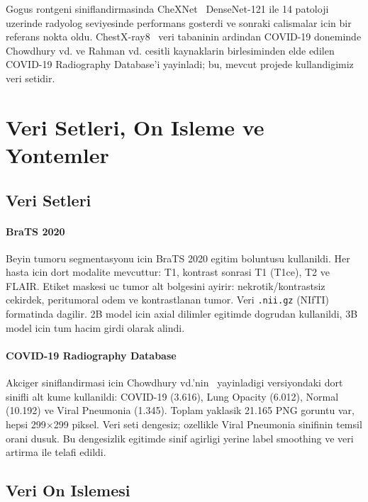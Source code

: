 \documentclass[conference]{IEEEtran}
\begin{document}
Gogus rontgeni siniflandirmasinda CheXNet~\cite{rajpurkar2017chexnet} DenseNet-121
ile 14 patoloji uzerinde radyolog seviyesinde performans gosterdi ve sonraki
calismalar icin bir referans nokta oldu. ChestX-ray8~\cite{wang2017chestxray8}
veri tabaninin ardindan COVID-19 doneminde Chowdhury vd. \cite{chowdhury2020covid}
ve Rahman vd. \cite{rahman2020exploring} cesitli kaynaklarin birlesiminden
elde edilen COVID-19 Radiography Database'i yayinladi; bu, mevcut projede
kullandigimiz veri setidir.

\section{Veri Setleri, On Isleme ve Yontemler}

\subsection{Veri Setleri}

\paragraph{BraTS 2020} Beyin tumoru segmentasyonu icin BraTS 2020 egitim
boluntusu kullanildi. Her hasta icin dort modalite mevcuttur: T1, kontrast
sonrasi T1 (T1ce), T2 ve FLAIR. Etiket maskesi uc tumor alt bolgesini ayirir:
nekrotik/kontrastsiz cekirdek, peritumoral odem ve kontrastlanan tumor. Veri
\texttt{.nii.gz} (NIfTI) formatinda dagilir. 2B model icin axial dilimler
egitimde dogrudan kullanildi, 3B model icin tum hacim girdi olarak alindi.

\paragraph{COVID-19 Radiography Database} Akciger siniflandirmasi icin
Chowdhury vd.'nin~\cite{chowdhury2020covid} yayinladigi versiyondaki dort
sinifli alt kume kullanildi: COVID-19 (3.616), Lung Opacity (6.012), Normal
(10.192) ve Viral Pneumonia (1.345). Toplam yaklasik 21.165 PNG goruntu var,
hepsi 299$\times$299 piksel. Veri seti dengesiz; ozellikle Viral Pneumonia
sinifinin temsil orani dusuk. Bu dengesizlik egitimde sinif agirligi yerine
label smoothing ve veri artirma ile telafi edildi.

\subsection{Veri On Islemesi}
\end{document}
